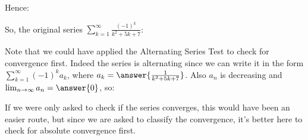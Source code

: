 \documentclass{ximera}
\begin{document}
\begin{exercise}
\begin{exercise}
Hence:

\begin{multipleChoice}
\end{multipleChoice}

So, the original series $\sum_{k=1}^{\infty} \frac{(-1)^k}{k^2+5k+7} $:
\begin{multipleChoice}
\end{multipleChoice}

\begin{exercise}
Note that we could have applied the Alternating Series Test to check for convergence first.  Indeed the series is alternating since we can write it in the form $\sum_{k=1}^{\infty} (-1)^k a_k$, where $a_k = \answer{\frac{1}{k^2+5k+7}}$. Also $a_n$ is decreasing and $\lim_{n \to \infty} a_n = \answer{0}$, so:

\begin{multipleChoice}
\end{multipleChoice}

If we were only asked to check if the series converges, this would have been an easier route, but since we are asked to classify the convergence, it's better here to check for absolute convergence first.
\end{exercise}

\end{exercise}
\end{exercise}
\end{document}
